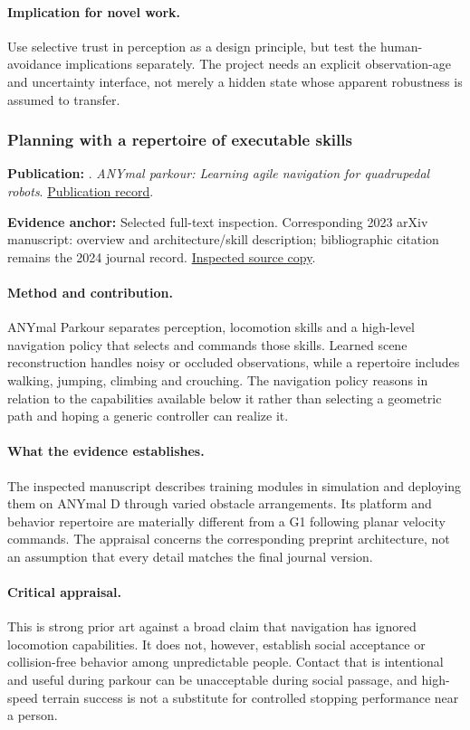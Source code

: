 \paragraph{Implication for novel work.} Use selective trust in perception as a design principle, but test the human-avoidance implications separately. The project needs an explicit observation-age and uncertainty interface, not merely a hidden state whose apparent robustness is assumed to transfer.

\subsubsection{Planning with a repertoire of executable skills}\label{paper:parkour}
\textbf{Publication:} \citet{parkour}. \emph{ANYmal parkour: Learning agile navigation for quadrupedal robots}. \href{https://doi.org/10.1126/scirobotics.adi7566}{Publication record}.

\textbf{Evidence anchor:} Selected full-text inspection. Corresponding 2023 arXiv manuscript: overview and architecture/skill description; bibliographic citation remains the 2024 journal record. \href{https://arxiv.org/pdf/2306.14874}{Inspected source copy}.

\paragraph{Method and contribution.} ANYmal Parkour separates perception, locomotion skills and a high-level navigation policy that selects and commands those skills. Learned scene reconstruction handles noisy or occluded observations, while a repertoire includes walking, jumping, climbing and crouching. The navigation policy reasons in relation to the capabilities available below it rather than selecting a geometric path and hoping a generic controller can realize it.

\paragraph{What the evidence establishes.} The inspected manuscript describes training modules in simulation and deploying them on ANYmal D through varied obstacle arrangements. Its platform and behavior repertoire are materially different from a G1 following planar velocity commands. The appraisal concerns the corresponding preprint architecture, not an assumption that every detail matches the final journal version.

\paragraph{Critical appraisal.} This is strong prior art against a broad claim that navigation has ignored locomotion capabilities. It does not, however, establish social acceptance or collision-free behavior among unpredictable people. Contact that is intentional and useful during parkour can be unacceptable during social passage, and high-speed terrain success is not a substitute for controlled stopping performance near a person.

